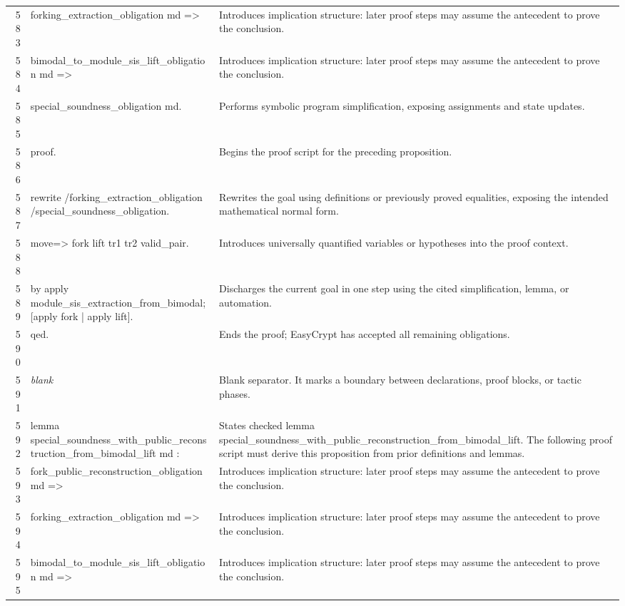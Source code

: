 \documentclass[10pt]{article}
\begin{document}
\begin{longtable}{r L{0.53\textwidth} L{0.37\textwidth}}
583 & {\ttfamily\scriptsize   forking\_extraction\_obligation md =>} & Introduces implication structure: later proof steps may assume the antecedent to prove the conclusion. \\
584 & {\ttfamily\scriptsize   bimodal\_to\_module\_sis\_lift\_obligation md =>} & Introduces implication structure: later proof steps may assume the antecedent to prove the conclusion. \\
585 & {\ttfamily\scriptsize   special\_soundness\_obligation md.} & Performs symbolic program simplification, exposing assignments and state updates. \\
586 & {\ttfamily\scriptsize proof.} & Begins the proof script for the preceding proposition. \\
587 & {\ttfamily\scriptsize rewrite /forking\_extraction\_obligation /special\_soundness\_obligation.} & Rewrites the goal using definitions or previously proved equalities, exposing the intended mathematical normal form. \\
588 & {\ttfamily\scriptsize move=> fork lift tr1 tr2 valid\_pair.} & Introduces universally quantified variables or hypotheses into the proof context. \\
589 & {\ttfamily\scriptsize by apply module\_sis\_extraction\_from\_bimodal; [apply fork | apply lift].} & Discharges the current goal in one step using the cited simplification, lemma, or automation. \\
590 & {\ttfamily\scriptsize qed.} & Ends the proof; EasyCrypt has accepted all remaining obligations. \\
591 & {\ttfamily\scriptsize \emph{blank}} & Blank separator.  It marks a boundary between declarations, proof blocks, or tactic phases. \\
592 & {\ttfamily\scriptsize lemma special\_soundness\_with\_public\_reconstruction\_from\_bimodal\_lift md :} & States checked lemma special\_soundness\_with\_public\_reconstruction\_from\_bimodal\_lift.  The following proof script must derive this proposition from prior definitions and lemmas. \\
593 & {\ttfamily\scriptsize   fork\_public\_reconstruction\_obligation md =>} & Introduces implication structure: later proof steps may assume the antecedent to prove the conclusion. \\
594 & {\ttfamily\scriptsize   forking\_extraction\_obligation md =>} & Introduces implication structure: later proof steps may assume the antecedent to prove the conclusion. \\
595 & {\ttfamily\scriptsize   bimodal\_to\_module\_sis\_lift\_obligation md =>} & Introduces implication structure: later proof steps may assume the antecedent to prove the conclusion. \\

\end{longtable}
\end{document}
